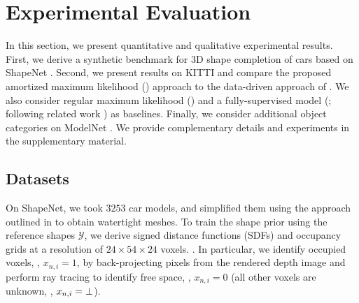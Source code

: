\section{Experimental Evaluation}
\label{sec:experiments}

In this section, we present quantitative and qualitative experimental results. First, we derive a synthetic benchmark for 3D shape completion of cars based on ShapeNet \cite{Chang2015ARXIV}. Second, we present results on KITTI \cite{Geiger2012CVPR} and compare the proposed amortized maximum likelihood (\AML) approach to the data-driven approach of \cite{Engelmann2016GCPR}.
We also consider regular maximum likelihood (\ML) and a fully-supervised model (\Sup; following related work \cite{Dai2016ARXIV,Sharma2016ARXIV,Riegler2017THREEDV,Han2017ICCV}) as baselines.
Finally, we consider additional object categories on ModelNet \cite{Wu2015CVPR}.
We provide complementary details and experiments in the supplementary material.

\subsection{Datasets}
\label{subsec:experiments-data}

%
On ShapeNet, we took $3253$ car models, and simplified them using the approach outlined in \cite{Guney2015CVPR} to obtain watertight meshes. 
To train the shape prior using the reference shapes $\mathcal{Y}$, we derive signed distance functions (SDFs) and occupancy grids at a resolution of $24 \times 54 \times 24$ voxels. . In particular, we identify occupied voxels, \ie, $x_{n,i} = 1$, by back-projecting pixels from the rendered depth image and perform ray tracing to identify free space, \ie, $x_{n,i} = 0$ (all other voxels are unknown, \ie, $x_{n,i} = \bot$).

